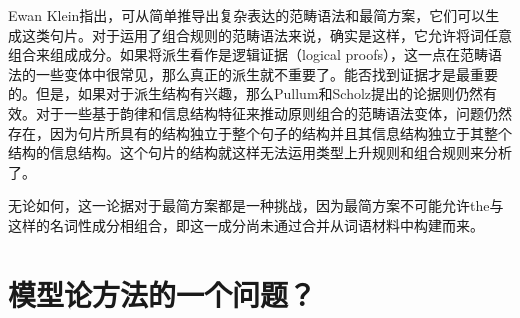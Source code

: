 Ewan Klein指出，可从简单推导出复杂表达的范畴语法\indexcgc 和最简方案，它们可以生成这类句片\citep[]{Pullum2013a}。对于运用了组合规则的范畴语法来说，确实是这样，它允许将词任意组合来组成成分。如果将派生看作是逻辑证据（logical proofs），这一点在范畴语法的一些变体中很常见，那么真正的派生就不重要了。能否找到证据才是最重要的。但是，如果对于派生结构有兴趣，那么Pullum和Scholz提出的论据则仍然有效。对于一些基于韵律和信息结构特征来推动原则组合的范畴语法变体\citep[\S~3]{Steedman91a}，问题仍然存在，因为句片所具有的结构独立于整个句子的结构并且其信息结构独立于其整个结构的信息结构。这个句片的结构就这样无法运用类型上升规则和组合规则来分析了。

无论如何，这一论据对于最简方案都是一种挑战，因为最简方案不可能允许the与这样的名词性成分相组合，即这一成分尚未通过合并从词语材料中构建而来。

\section{模型论方法的一个问题？}
\label{Abschnitt-MTS-ten-Hacken}

